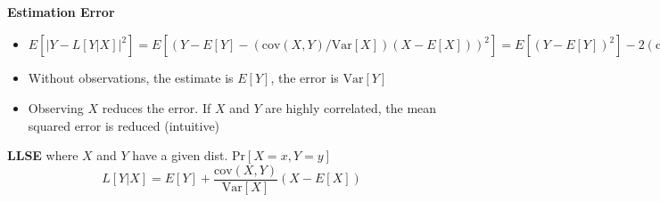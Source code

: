 \documentclass{article}\usepackage{amsmath,amssymb,amsthm,tikz,tkz-graph,color,chngpage,soul,hyperref,csquotes,graphicx,floatrow,listings, mathrsfs,framed,scrextend}\newcommand*{\QEDB}{\hfill\ensuremath{\square}}\newtheorem*{prop}{Proposition}\renewcommand{\theenumi}{\alph{enumi}}\usepackage[shortlabels]{enumitem}\usepackage[nobreak=true]{mdframed}\usetikzlibrary{matrix,calc}\MakeOuterQuote{"}\usepackage[margin=0.75in]{geometry} \newtheorem{theorem}{Theorem}
\newcommand{\x}[1]{\textrm{#1}}
\newcommand{\pr}[1]{\textrm{Pr}[#1]}
\newcommand{\eq}[1]{\begin{equation}#1\end{equation}}
\newcommand{\eqs}[1]{\begin{mdframed}#1\end{mdframed}}
\providecommand{\abs}[1]{\lvert#1\rvert} \providecommand{\norm}[1]{\lVert#1\rVert}
\newcommand{\items}[1]{\begin{itemize}#1\end{itemize}}
\newcommand{\E}[1]{E[#1]}
\newcommand{\var}[1]{\x{Var}[#1]}
\newcommand{\cov}{\x{cov}}
\begin{document}
\textbf{Estimation Error}
\items{
    \item $\E{\abs{Y -L[Y|X]}^2} = \E{(Y -\E{Y}-(\cov(X,Y)/\var{X})(X -\E{X}))^2}= \E{(Y -\E{Y})^2}-2(\cov(X,Y)/\var{X})\E{(Y -\E{Y})(X -\E{X})}+(\cov(X,Y)/\var{X})^2\E{(X -\E{X})^2}= \var{Y}-\frac{\cov(X,Y)^2}{\var{X}}$
    \item Without observations, the estimate is $\E{Y}$, the error is $\var{Y}$
    \item Observing $X$ reduces the error. If $X$ and $Y$ are highly correlated, the mean squared error is reduced (intuitive)
}
\eqs{
\textbf{LLSE} where $X$ and $Y$ have a given dist. $\pr{X=x,Y=y}$
\eq{L[Y|X]=\E{Y}+\frac{\cov(X,Y)}{\var{X}}(X-\E{X})}
}
\end{document}
